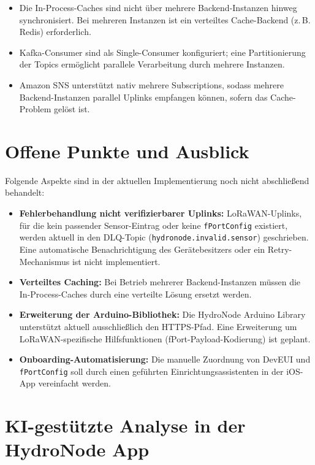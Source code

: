 \begin{itemize}
  \item Die In-Process-Caches sind nicht über mehrere Backend-Instanzen hinweg synchronisiert.
        Bei mehreren Instanzen ist ein verteiltes Cache-Backend (z.\,B. Redis) erforderlich.
  \item Kafka-Consumer sind als Single-Consumer konfiguriert; eine Partitionierung
        der Topics ermöglicht parallele Verarbeitung durch mehrere Instanzen.
  \item Amazon SNS unterstützt nativ mehrere Subscriptions, sodass mehrere Backend-Instanzen
        parallel Uplinks empfangen können, sofern das Cache-Problem gelöst ist.
\end{itemize}

\newpage

\section*{Offene Punkte und Ausblick}

Folgende Aspekte sind in der aktuellen Implementierung noch nicht abschließend behandelt:

\begin{itemize}
  \item \textbf{Fehlerbehandlung nicht verifizierbarer Uplinks:} LoRaWAN-Uplinks, für die kein
        passender Sensor-Eintrag oder keine \texttt{fPortConfig} existiert, werden aktuell
        in den DLQ-Topic (\texttt{hydronode.invalid.sensor}) geschrieben. Eine automatische
        Benachrichtigung des Gerätebesitzers oder ein Retry-Mechanismus ist nicht implementiert.
  \item \textbf{Verteiltes Caching:} Bei Betrieb mehrerer Backend-Instanzen müssen die
        In-Process-Caches durch eine verteilte Lösung ersetzt werden.
  \item \textbf{Erweiterung der Arduino-Bibliothek:} Die HydroNode Arduino Library unterstützt
        aktuell ausschließlich den HTTPS-Pfad. Eine Erweiterung um LoRaWAN-spezifische
        Hilfsfunktionen (fPort-Payload-Kodierung) ist geplant.
  \item \textbf{Onboarding-Automatisierung:} Die manuelle Zuordnung von DevEUI und
        \texttt{fPortConfig} soll durch einen geführten Einrichtungsassistenten in der
        iOS-App vereinfacht werden.
\end{itemize}

\newpage
\section*{KI-gestützte Analyse in der HydroNode App}

